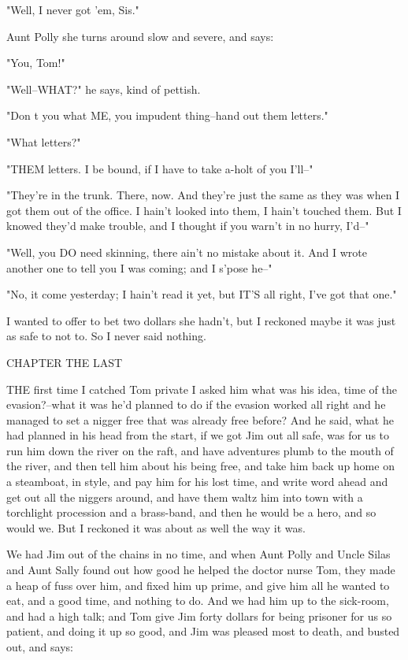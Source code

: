 "Well, I never got 'em, Sis."

Aunt Polly she turns around slow and severe, and says:

"You, Tom!"

"Well--WHAT?" he says, kind of pettish.

"Don t you what ME, you impudent thing--hand out them letters."

"What letters?"

"THEM letters.  I be bound, if I have to take a-holt of you I'll--"

"They're in the trunk.  There, now.  And they're just the same as they
was when I got them out of the office.  I hain't looked into them, I
hain't touched them.  But I knowed they'd make trouble, and I thought if
you warn't in no hurry, I'd--"

"Well, you DO need skinning, there ain't no mistake about it.  And I
wrote another one to tell you I was coming; and I s'pose he--"

"No, it come yesterday; I hain't read it yet, but IT'S all right, I've
got that one."

I wanted to offer to bet two dollars she hadn't, but I reckoned maybe it
was just as safe to not to.  So I never said nothing.




CHAPTER THE LAST

THE first time I catched Tom private I asked him what was his idea, time
of the evasion?--what it was he'd planned to do if the evasion worked all
right and he managed to set a nigger free that was already free before?
And he said, what he had planned in his head from the start, if we got
Jim out all safe, was for us to run him down the river on the raft, and
have adventures plumb to the mouth of the river, and then tell him about
his being free, and take him back up home on a steamboat, in style, and
pay him for his lost time, and write word ahead and get out all the
niggers around, and have them waltz him into town with a torchlight
procession and a brass-band, and then he would be a hero, and so would
we.  But I reckoned it was about as well the way it was.

We had Jim out of the chains in no time, and when Aunt Polly and Uncle
Silas and Aunt Sally found out how good he helped the doctor nurse Tom,
they made a heap of fuss over him, and fixed him up prime, and give him
all he wanted to eat, and a good time, and nothing to do.  And we had him
up to the sick-room, and had a high talk; and Tom give Jim forty dollars
for being prisoner for us so patient, and doing it up so good, and Jim
was pleased most to death, and busted out, and says:

